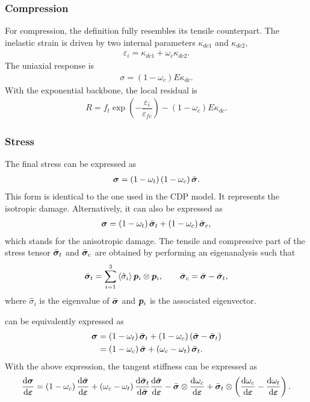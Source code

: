 \subsubsection{Compression}
For compression, the definition fully resembles its tensile counterpart. The inelastic strain is driven by two internal parameters $\kappa_{dc1}$ and $\kappa_{dc2}$,
\begin{gather}
\varepsilon_i=\kappa_{dc1}+\omega_c\kappa_{dc2}.
\end{gather}
The uniaxial response is
\begin{gather}
\sigma=\left(1-\omega_c\right)E\kappa_{dc}.
\end{gather}
With the exponential backbone, the local residual is
\begin{gather}
R=f_t\exp\left(-\dfrac{\varepsilon_i}{\varepsilon_{fc}}\right)-\left(1-\omega_c\right)E\kappa_{dc}.
\end{gather}
\subsubsection{Stress}
The final stress can be expressed as
\begin{gather}
\bm{\sigma}=\left(1-\omega_t\right)\left(1-\omega_c\right)\bar{\bm{\sigma}}.
\end{gather}
This form is identical to the one used in the CDP model. It represents the isotropic damage.
Alternatively, it can also be expressed as
\begin{gather}\label{eq:aniso_damage}
\bm{\sigma}=\left(1-\omega_t\right)\bar{\bm{\sigma}}_t+\left(1-\omega_c\right)\bar{\bm{\sigma}}_c,
\end{gather}
which stands for the anisotropic damage. The tensile and compressive part of the stress tensor $\bar{\bm{\sigma}}_t$ and $\bar{\bm{\sigma}}_c$ are obtained by performing an eigenanalysis such that
\begin{gather}
\bar{\bm{\sigma}}_t=\sum_{i=1}^3\left\langle\hat{\sigma}_i\right\rangle\bm{p}_i\otimes\bm{p}_i,\qquad\bar{\bm{\sigma}}_c=\bar{\bm{\sigma}}-\bar{\bm{\sigma}}_t,
\end{gather}
where $\hat{\sigma}_i$ is the eigenvalue of $\bar{\bm{\sigma}}$ and $\bm{p}_i$ is the associated eigenvector.

 can be equivalently expressed as
\begin{gather}
\begin{split}
\bm{\sigma}&=\left(1-\omega_t\right)\bar{\bm{\sigma}}_t+\left(1-\omega_c\right)\left(\bar{\bm{\sigma}}-\bar{\bm{\sigma}}_t\right)\\
&=\left(1-\omega_c\right)\bar{\bm{\sigma}}+\left(\omega_c-\omega_t\right)\bar{\bm{\sigma}}_t.
\end{split}
\end{gather}
With the above expression, the tangent stiffness can be expressed as
\begin{gather}
\dfrac{\mathrm{d}\bm{\sigma}}{\mathrm{d}\bm{\varepsilon}}=\left(1-\omega_c\right)\dfrac{\mathrm{d}\bar{\bm{\sigma}}}{\mathrm{d}\bm{\varepsilon}}+\left(\omega_c-\omega_t\right)\dfrac{\mathrm{d}\bar{\bm{\sigma}}_t}{\mathrm{d}\bar{\bm{\sigma}}}\dfrac{\mathrm{d}\bar{\bm{\sigma}}}{\mathrm{d}\bm{\varepsilon}}-\bar{\bm{\sigma}}\otimes\dfrac{\mathrm{d}\omega_c}{\mathrm{d}\bm{\varepsilon}}+\bar{\bm{\sigma}}_t\otimes\left(\dfrac{\mathrm{d}\omega_c}{\mathrm{d}\bm{\varepsilon}}-\dfrac{\mathrm{d}\omega_t}{\mathrm{d}\bm{\varepsilon}}\right).
\end{gather}
